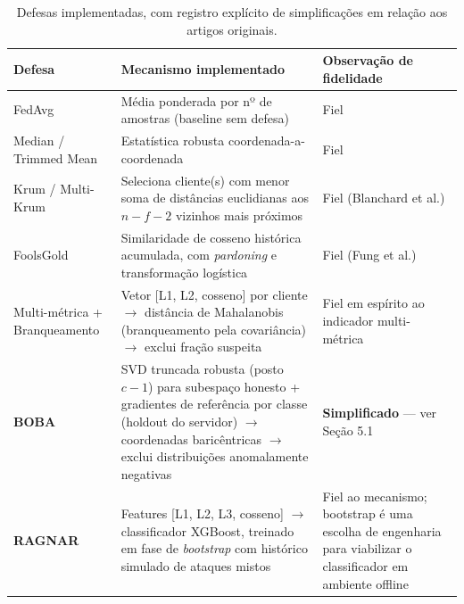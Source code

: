 \documentclass[11pt,a4paper]{article}
\begin{document}
\begin{table}[htbp]
\centering
\fontsize{8}{10}\selectfont
\begin{tabular}{p{2.6cm}p{6.7cm}p{5.3cm}}
\toprule
\textbf{Defesa} & \textbf{Mecanismo implementado} & \textbf{Observação de fidelidade} \\
\midrule
\rowcolor{lightbg} FedAvg & Média ponderada por nº de amostras (baseline sem defesa) & Fiel \\
Median / Trimmed Mean & Estatística robusta coordenada-a-coordenada & Fiel \\
\rowcolor{lightbg} Krum / Multi-Krum & Seleciona cliente(s) com menor soma de distâncias euclidianas aos $n-f-2$ vizinhos mais próximos & Fiel (Blanchard et al.) \\
FoolsGold & Similaridade de cosseno histórica acumulada, com \textit{pardoning} e transformação logística & Fiel (Fung et al.) \\
\rowcolor{lightbg} Multi-métrica + Branqueamento & Vetor [L1, L2, cosseno] por cliente $\to$ distância de Mahalanobis (branqueamento pela covariância) $\to$ exclui fração suspeita & Fiel em espírito ao indicador multi-métrica \cite{multimetrics} \\
\textbf{BOBA} & SVD truncada robusta (posto $c{-}1$) para subespaço honesto + gradientes de referência por classe (holdout do servidor) $\to$ coordenadas baricêntricas $\to$ exclui distribuições anomalamente negativas & \textbf{Simplificado} — ver Seção 5.1 \\
\rowcolor{lightbg} \textbf{RAGNAR} & Features [L1, L2, L3, cosseno] $\to$ classificador XGBoost, treinado em fase de \textit{bootstrap} com histórico simulado de ataques mistos & Fiel ao mecanismo; bootstrap é uma escolha de engenharia para viabilizar o classificador em ambiente offline \\
\bottomrule
\end{tabular}
\caption{Defesas implementadas, com registro explícito de simplificações em relação aos artigos originais.}
\end{table}
\end{document}

